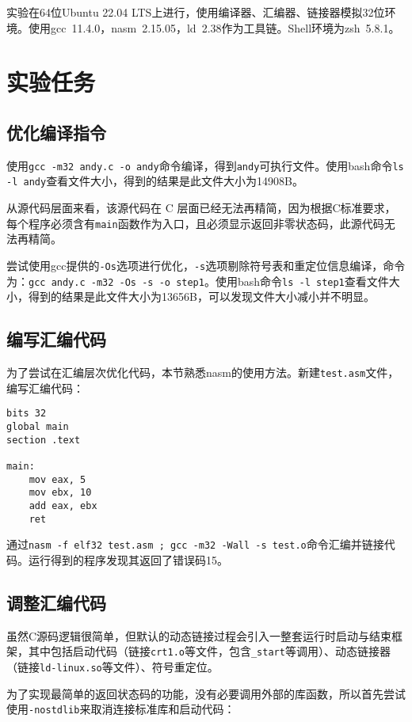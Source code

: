 \documentclass[a4paper, 11pt]{ctexart}
\let\oldsection\section
\renewcommand{\section}{\clearpage\oldsection}
\begin{document}
实验在64位Ubuntu 22.04 LTS上进行，使用编译器、汇编器、链接器模拟32位环境。使用gcc~11.4.0，nasm~2.15.05，ld~2.38作为工具链。Shell环境为zsh~5.8.1。

\section{实验任务}
\subsection{优化编译指令}
使用\texttt{gcc -m32 andy.c -o andy}命令编译，得到\texttt{andy}可执行文件。使用bash命令\texttt{ls -l andy}查看文件大小，得到的结果是此文件大小为14908B。

从源代码层面来看，该源代码在 C 层面已经无法再精简，因为根据C标准要求，每个程序必须含有\texttt{main}函数作为入口，且必须显示返回非零状态码，此源代码无法再精简。

尝试使用gcc提供的\texttt{-Os}选项进行优化，\texttt{-s}选项剔除符号表和重定位信息编译，命令为：\texttt{gcc andy.c -m32 -Os -s -o step1}。使用bash命令\texttt{ls -l step1}查看文件大小，得到的结果是此文件大小为13656B，可以发现文件大小减小并不明显。

\subsection{编写汇编代码}
\label{sec:asm}

为了尝试在汇编层次优化代码，本节熟悉nasm的使用方法。新建\texttt{test.asm}文件，编写汇编代码：

\begin{verbatim}
bits 32
global main
section .text

main:
    mov eax, 5
    mov ebx, 10
    add eax, ebx
    ret
\end{verbatim}

通过\texttt{nasm -f elf32 test.asm ; gcc -m32 -Wall -s test.o}命令汇编并链接代码。运行得到的程序发现其返回了错误码15。

\subsection{调整汇编代码}
虽然C源码逻辑很简单，但默认的动态链接过程会引入一整套运行时启动与结束框架，其中包括启动代码（链接\texttt{crt1.o}等文件，包含\texttt{\_start}等调用）、动态链接器（链接\texttt{ld-linux.so}等文件）、符号重定位。

为了实现最简单的返回状态码的功能，没有必要调用外部的库函数，所以首先尝试使用\texttt{-nostdlib}来取消连接标准库和启动代码：
\end{document}

